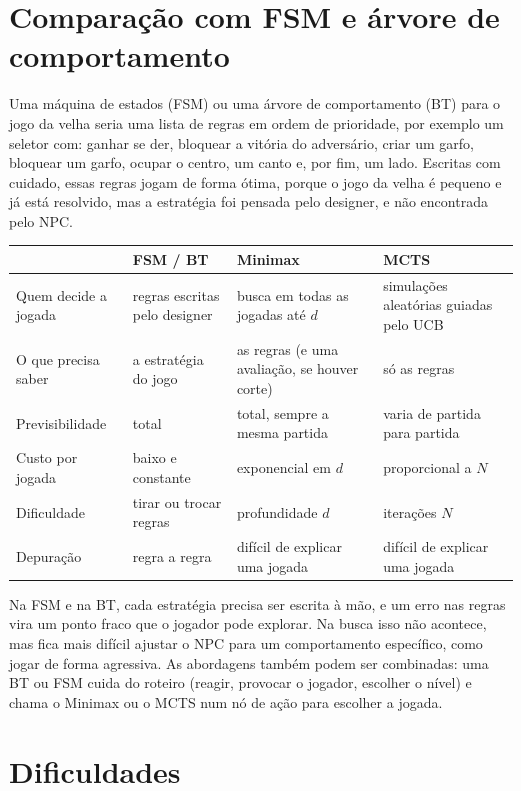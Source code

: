 \documentclass[11pt,a4paper]{article}
\begin{document}
\section{Comparação com FSM e árvore de comportamento}

Uma máquina de estados (FSM) ou uma árvore de comportamento (BT) para o jogo
da velha seria uma lista de regras em ordem de prioridade, por exemplo um
seletor com: ganhar se der, bloquear a vitória do adversário, criar um garfo,
bloquear um garfo, ocupar o centro, um canto e, por fim, um lado. Escritas com
cuidado, essas regras jogam de forma ótima, porque o jogo da velha é pequeno e
já está resolvido, mas a estratégia foi pensada pelo designer, e não
encontrada pelo NPC.

\begin{center}
\begin{tabularx}{\textwidth}{@{}l>{\raggedright\arraybackslash}X
  >{\raggedright\arraybackslash}X>{\raggedright\arraybackslash}X@{}}
\toprule
 & FSM / BT & Minimax & MCTS \\
\midrule
Quem decide a jogada & regras escritas pelo designer & busca em todas as
  jogadas até $d$ & simulações aleatórias guiadas pelo UCB \\
O que precisa saber & a estratégia do jogo & as regras (e uma avaliação, se
  houver corte) & só as regras \\
Previsibilidade & total & total, sempre a mesma partida & varia de partida
  para partida \\
Custo por jogada & baixo e constante & exponencial em $d$ & proporcional a $N$ \\
Dificuldade & tirar ou trocar regras & profundidade $d$ & iterações $N$ \\
Depuração & regra a regra & difícil de explicar uma jogada & difícil de
  explicar uma jogada \\
\bottomrule
\end{tabularx}
\end{center}

Na FSM e na BT, cada estratégia precisa ser escrita à mão, e um erro nas
regras vira um ponto fraco que o jogador pode explorar. Na busca isso não
acontece, mas fica mais difícil ajustar o NPC para um comportamento
específico, como jogar de forma agressiva. As abordagens também podem ser
combinadas: uma BT ou FSM cuida do roteiro (reagir, provocar o jogador,
escolher o nível) e chama o Minimax ou o MCTS num nó de ação para escolher a
jogada.

\section{Dificuldades}
\end{document}
